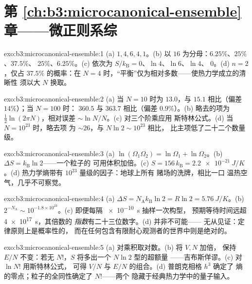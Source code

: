 \section*{第 \ref{ch:b3:microcanonical-ensemble} 章——微正则系综}

\begin{solution}{exo:b3:microcanonical-ensemble:1}
(a) $1, 4, 6, 4, 1$。(b) 以 $16$ 为分母：$6.25\%$、$25\%$、$37.5\%$、
$25\%$、$6.25\%$。(c) 依次为 $S/k_{\text{B}} = 0$、$\ln4$、$\ln6$、$\ln4$、
$0$。(d) $n = 2$，仅占 $37.5\%$ 的概率：在
$N = 4$ 时，“平衡”仅为相对多数——使热力学成立的清晰性
须以大 $N$ 换取。
\end{solution}

\begin{solution}{exo:b3:microcanonical-ensemble:2}
(a) 当 $N = 10$ 时为 $13.0$，与 $15.1$ 相比（偏差 $14\%$）；当 $N = 100$ 时：
$360.5$ 与 $363.7$ 相比（偏差 $0.9\%$）。(b) 略去的项为
$\tfrac12\ln(2\pi N)$，相对误差 $\sim\ln N/N$。(c) 对三个阶乘应用
斯特林公式。(d) 当 $N = 10^{23}$ 时，略去项
为 $\sim26$，与 $N\ln2 \sim 10^{23}$ 相比，
比主项低了二十二个数量级。
\end{solution}

\begin{solution}{exo:b3:microcanonical-ensemble:3}
(a) $\ln(\Omega_1\Omega_2) = \ln\Omega_1 + \ln\Omega_2$。(b)
$\Delta S = k_{\text{B}}\ln2$——一个粒子的
可用体积加倍。(c) $S = 156\,k_{\text{B}} = \qty{2.2e-21}{J/K}$。(d)
热力学熵带有 $10^{23}$ 量级的因子：地球上所有
赌场的洗牌，相比一口
温热空气，几乎不可察觉。
\end{solution}

\begin{solution}{exo:b3:microcanonical-ensemble:4}
(a) $\Delta S = N_{\text{A}}k_{\text{B}}\ln2 = R\ln2 =
\qty{5.76}{J/K}$。(b) $2^{-N_{\text{A}}} \sim 10^{-1.8\times
10^{23}}$。(c) 即便每隔 \qty{e-10}{s} 抽样一次构型，
预期等待时间远超 \qty{4e17}{s}，其倍数的
\emph{指数}有二十三位数字。(d) 并非不可能——
无从见证：定律原则上是概率性的，
而在任何包含有限耐心观测者的世界中则是绝对的。
\end{solution}

\begin{solution}{exo:b3:microcanonical-ensemble:5}
(a) 对乘积取对数。(b) 将 $V, N$ 加倍，
保持 $E/N$ 不变：若无 $N!$，$S$ 将多出一个 $N\ln2$ 型的超额量
——吉布斯佯谬。(c) 对 $\ln N!$ 用斯特林公式，
可得 $V/N$ 与 $E/N$ 的组合。(d) 普朗克相格 $h^3$ 确定了
熵的零点；粒子的全同性确定了 $N!$——两个
隐藏于经典热力学中的量子输入。
\end{solution}

